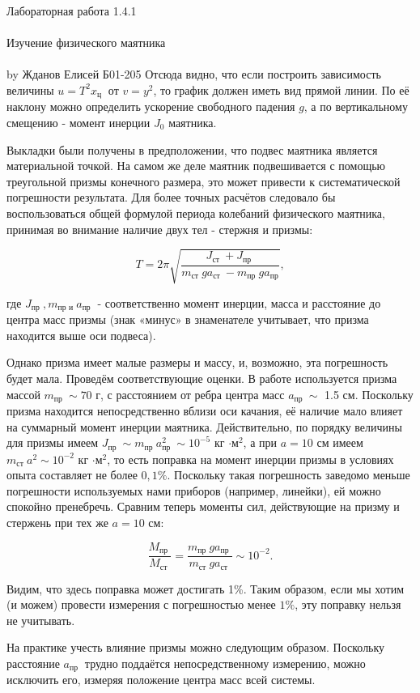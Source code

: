 \documentclass{astroedu-lab}
\begin{document}
\begin{problem}{\huge Лабораторная работа 1.4.1\\\\Изучение физического маятника\\\\by Жданов Елисей Б01-205}
Отсюда видно, что если построить зависимость величины \(u=T^{2} x_{\text {ц  }}\) от \(v=y^{2}\), то график должен иметь вид прямой линии. По её наклону можно определить ускорение свободного падения \(g\), а по вертикальному смещению - момент инерции \(J_{0}\) маятника.

Выкладки были получены в предположении, что подвес маятника является материальной точкой. На самом же деле маятник подвешивается с помощью треугольной призмы конечного размера, это может привести к систематической погрешности результата. Для более точных расчётов следовало бы воспользоваться общей формулой периода колебаний физического маятника, принимая во внимание наличие двух тел - стержня и призмы:

\[
T=2 \pi \sqrt{\frac{J_{\text {ст }}+J_{\text {пр }}}{m_{\text {ст }} g a_{\text {ст }}-m_{\text {пр }} g a_{\text{пр}}}},
\]

где \(J_{\text {пр }}, m_{\text {пр и }} a_{\text {пр }}\) - соответственно момент инерции, масса и расстояние до центра масс призмы (знак «минус» в знаменателе учитывает, что призма находится выше оси подвеса).

Однако призма имеет малые размеры и массу, и, возможно, эта погрешность будет мала. Проведём соответствующие оценки. В работе используется призма массой \(m_{\text {пр }} \sim 70\) г, с расстоянием от ребра центра масс \(a_{\text {пр }} \sim\) 1.5 см. Поскольку призма находится непосредственно вблизи оси качания, её наличие мало влияет на суммарный момент инерции маятника. Действительно, по порядку величины для призмы имеем \(J_{\text {пр }} \sim m_{\text {пр }} a_{\text {пр }}^{2} \sim 10^{-5}\) кг \(\cdot \text{м}^{2}\), а при \(a=10\) см имеем \(m_{\text {ст }} a^{2} \sim 10^{-2}\) кг \(\cdot \text{м}^{2}\), то есть поправка на момент инерции призмы в условиях опыта составляет не более \(0,1 \%\). Поскольку такая погрешность заведомо меньше погрешности используемых нами приборов (например, линейки), ей можно спокойно пренебречь. Сравним теперь моменты сил, действующие на призму и стержень при тех же \(a=10 \text{ см}:\)

\[
\frac{M_{\text {пр }}}{M_{\text {ст }}}=\frac{m_{\text {пр }} g a_{\text {пр }}}{m_{\text {ст }} g a_{\text {ст }}} \sim 10^{-2} .
\]

Видим, что здесь поправка может достигать 1\%. Таким образом, если мы хотим (и можем) провести измерения с погрешностью менее \(1 \%\), эту поправку нельзя не учитывать.

На практике учесть влияние призмы можно следующим образом. Поскольку расстояние \(a_{\text {пр }}\) трудно поддаётся непосредственному измерению, можно исключить его, измеряя положение центра масс всей системы.


\end{problem}
\end{document}
